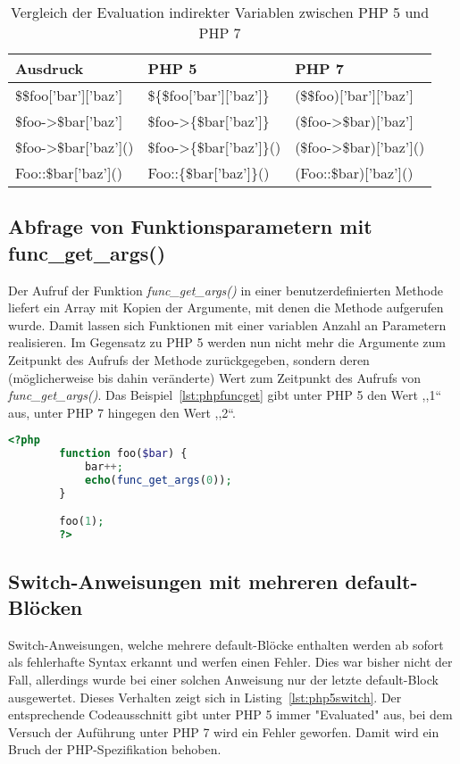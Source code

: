     \begin{table}[]
        \caption{Vergleich der Evaluation indirekter Variablen zwischen PHP 5 und PHP 7}
        \label{tab:indirect-expressions}
        \begin{tabular}{lll}
        \textbf{Ausdruck}               & \textbf{PHP 5}                    & \textbf{PHP 7}                \\ \hline
        \$\$foo{[}'bar'{]}{[}'baz'{]}   & \$\{\$foo{[}'bar'{]}{[}'baz'{]}\} & (\$\$foo){[}'bar'{]}{[}'baz'{]} \\ \hline
        \$foo->\$bar{[}'baz'{]}         & \$foo->\{\$bar{[}'baz'{]}\}       & (\$foo->\$bar){[}'baz'{]}       \\ \hline
        \$foo->\$bar{[}'baz'{]}()       & \$foo->\{\$bar{[}'baz'{]}\}()     & (\$foo->\$bar){[}'baz'{]}()     \\ \hline
        Foo::\$bar{[}'baz'{]}()         & Foo::\{\$bar{[}'baz'{]}\}()       & (Foo::\$bar){[}'baz'{]}()    
        \end{tabular}
    \end{table}

    \subsection{Abfrage von Funktionsparametern mit func\_get\_args()}
    Der Aufruf der Funktion \textit{func\_get\_args()} in einer benutzerdefinierten Methode liefert ein Array mit Kopien der 
    Argumente, mit denen die Methode aufgerufen wurde. Damit lassen sich Funktionen mit einer variablen Anzahl an Parametern 
    realisieren. Im Gegensatz zu \ac{PHP} 5 werden nun nicht mehr die Argumente zum Zeitpunkt des Aufrufs der Methode 
    zurückgegeben, sondern deren (möglicherweise bis dahin veränderte) Wert zum Zeitpunkt des Aufrufs von 
    \textit{func\_get\_args()}. Das Beispiel~\ref{lst:phpfuncget} gibt unter \ac{PHP} 5 den Wert ,,1`` aus, unter \ac{PHP} 7 
    hingegen den Wert ,,2``.

    \begin{lstlisting}[language=php, caption={Beispiel des Aufrufs von func\_get\_args()}, label={lst:phpfuncget}]
        <?php
        function foo($bar) {
            bar++;
            echo(func_get_args(0));
        }

        foo(1);
        ?>
    \end{lstlisting}

    \subsection{Switch-Anweisungen mit mehreren default-Blöcken}\label{switch}
    Switch-Anweisungen, welche mehrere default-Blöcke enthalten werden ab sofort als fehlerhafte Syntax erkannt und werfen einen Fehler. Dies war bisher nicht der Fall,
    allerdings wurde bei einer solchen Anweisung nur der letzte default-Block ausgewertet. Dieses Verhalten zeigt sich in Listing~\ref{lst:php5switch}. Der entsprechende
    Codeausschnitt gibt unter \acs{PHP} 5 immer "Evaluated" aus, bei dem Versuch der Auführung unter \acs{PHP} 7 wird ein Fehler geworfen. Damit wird ein Bruch der
    \acs{PHP}-Spezifikation \cite{php_group_php_nodate} behoben.

